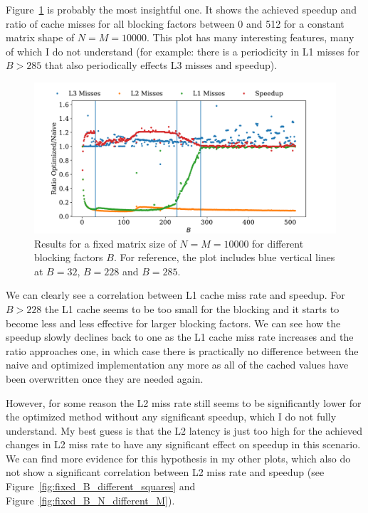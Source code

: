 \documentclass[a4paper, 11pt]{article}
\begin{document}
Figure~\ref{fig:square_against_B} is probably the most insightful one. It shows
the achieved speedup and ratio of cache misses for all blocking factors between
0 and 512 for a constant matrix shape of $N = M = 10000$. This plot has many
interesting features, many of which I do not understand (for example: there is
a periodicity in L1 misses for $B>285$ that also periodically effects L3 misses
and speedup).
\begin{figure}
  \centering
  \includegraphics[width=\textwidth]{../plot/square_against_B.pdf}
  \caption{Results for a fixed matrix size of $N = M = 10000$ for different
  blocking factors $B$. For reference, the plot includes blue vertical lines
  at $B=32$, $B=228$ and $B=285$.}
  \label{fig:square_against_B}
\end{figure}

We can clearly see a correlation between L1 cache miss rate and speedup. For $B
> 228$ the L1 cache seems to be too small for the blocking and it starts to
become less and less effective for larger blocking factors. We can see how the
speedup slowly declines back to one as the L1 cache miss rate increases and the
ratio approaches one, in which case there is practically no difference between
the naive and optimized implementation any more as all of the cached values
have been overwritten once they are needed again.

However, for some reason the L2 miss rate still seems to be significantly lower
for the optimized method without any significant speedup, which I do not fully
understand. My best guess is that the L2 latency is just too high for the
achieved changes in L2 miss rate to have any significant effect on speedup in
this scenario. We can find more evidence for this hypothesis in my other plots,
which also do not show a significant correlation between L2 miss rate and
speedup (see Figure~\ref{fig:fixed_B_different_squares} and
Figure~\ref{fig:fixed_B_N_different_M}).
\end{document}
